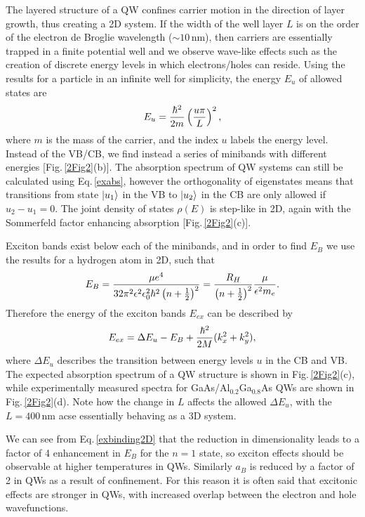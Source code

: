 The layered structure of a QW confines carrier motion in the direction of layer growth, thus creating a 2D system. If the width of the well layer $L$ is on the order of the electron de Broglie wavelength ($\sim10$\,nm), then carriers are essentially trapped in a finite potential well and we observe wave-like effects such as the creation of discrete energy levels in which electrons/holes can reside. Using the results for a particle in an infinite well for simplicity, the energy $E_u$ of allowed states are
\begin{equation}
\centering
E_u = \frac{\hbar^2}{2m} \left(\frac{u\pi}{L}\right)^2 ,
\label{particleboxenergy}
\end{equation}
where $m$ is the mass of the carrier, and the index $u$ labels the energy level. Instead of the VB/CB, we find instead a series of minibands with different energies [Fig.\,\ref{2Fig2}(b)]. The absorption spectrum of QW systems can still be calculated using Eq.\,\ref{exabs}, however the orthogonality of eigenstates means that transitions from state $\Ket{u_1}$ in the VB to $\Ket{u_2}$ in the CB are only allowed if $u_2-u_1=0$. The joint density of states $\rho(E)$ is step-like in 2D, again with the Sommerfeld factor enhancing absorption [Fig.\,\ref{2Fig2}(c)].

Exciton bands exist below each of the minibands, and in order to find $E_B$ we use the results for a hydrogen atom in 2D, such that
\begin{equation}
\centering
E_B =\frac{\mu e^4}{32\pi^2\epsilon^2\epsilon_0^2\hbar^2\left(n+\frac{1}{2}\right)^2} = \frac{R_H}{\left(n+\frac{1}{2}\right)^2}\frac{\mu}{\epsilon^2 m_e} .
\label{exbinding2D}
\end{equation}
Therefore the energy of the exciton bands $E_{ex}$ can be described by
\begin{equation}
\centering
E_{ex} = \Delta E_u - E_B + \frac{\hbar^2}{2M}(k_x^2+k_y^2) ,
\label{exenergy2D}
\end{equation}
where $\Delta E_u$ describes the transition between energy levels $u$ in the CB and VB. The expected absorption spectrum of a QW structure is shown in Fig.\,\ref{2Fig2}(c), while experimentally measured spectra for GaAs/Al$_{0.2}$Ga$_{0.8}$As QWs are shown in Fig.\,\ref{2Fig2}(d). Note how the change in $L$ affects the allowed $\Delta E_u$, with the $L=400$\,nm acse essentially behaving as a 3D system.

We can see from Eq.\,\ref{exbinding2D} that the reduction in dimensionality leads to a factor of 4 enhancement in $E_B$ for the $n=1$ state, so exciton effects should be observable at higher temperatures in QWs. Similarly $a_B$ is reduced by a factor of 2 in QWs as a result of confinement. For this reason it is often said that excitonic effects are stronger in QWs, with increased overlap between the electron and hole wavefunctions.

